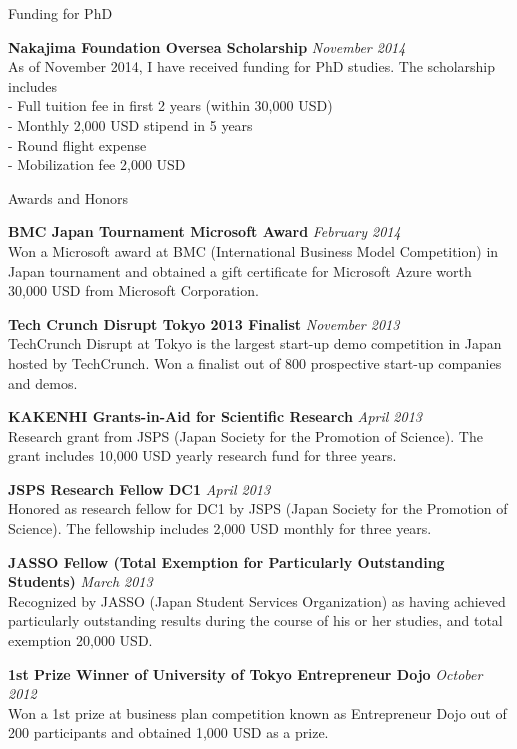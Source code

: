 \documentclass{resume} %
\begin{document}
\begin{rSection}{Funding for PhD}

{\bf Nakajima Foundation Oversea Scholarship} \hfill {\em November 2014} \\
As of November 2014, I have received funding for PhD studies. 
The scholarship includes \\
- Full tuition fee in first 2 years (within 30,000 USD) \\
- Monthly 2,000 USD stipend in 5 years \\
- Round flight expense \\
- Mobilization fee 2,000 USD \\

\end{rSection}

\begin{rSection}{Awards and Honors}

{\bf BMC Japan Tournament Microsoft Award} \hfill {\em February 2014} \\
Won a Microsoft award at BMC (International Business Model Competition) in Japan tournament and obtained a gift certificate for Microsoft Azure worth 30,000 USD from Microsoft Corporation.

{\bf Tech Crunch Disrupt Tokyo 2013 Finalist} \hfill {\em November 2013} \\
TechCrunch Disrupt at Tokyo is the largest start-up demo competition in Japan hosted by TechCrunch.
Won a finalist out of 800 prospective start-up companies and demos.

{\bf KAKENHI Grants-in-Aid for Scientific Research} \hfill {\em April 2013} \\
Research grant from JSPS (Japan Society for the Promotion of Science).
The grant includes 10,000 USD yearly research fund for three years.

{\bf JSPS Research Fellow DC1} \hfill {\em April 2013} \\
Honored as research fellow for DC1 by JSPS (Japan Society for the Promotion of Science).
The fellowship includes 2,000 USD monthly for three years.

{\bf JASSO Fellow (Total Exemption for Particularly Outstanding Students) } \hfill {\em March 2013} \\
Recognized by JASSO (Japan Student Services Organization) as having achieved particularly outstanding results during the course of his or her studies, and total exemption 20,000 USD.

{\bf 1st Prize Winner of University of Tokyo Entrepreneur Dojo} \hfill {\em October 2012} \\
Won a 1st prize at business plan competition known as Entrepreneur Dojo out of 200 participants and obtained 1,000 USD as a prize.


\end{rSection}
\end{document}
